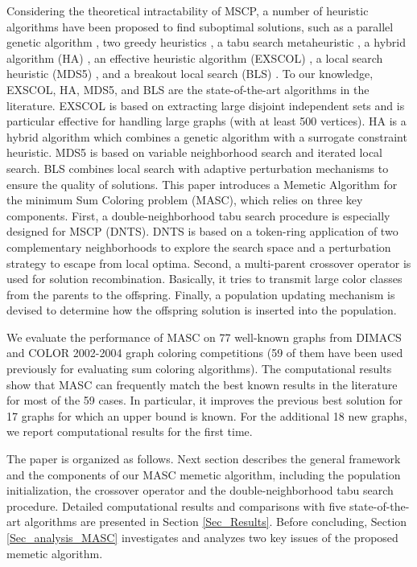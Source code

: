 \documentclass{elsart}
\begin{document}
Considering the theoretical intractability of MSCP, a number of heuristic algorithms have been proposed to find suboptimal solutions, such as a parallel genetic algorithm \cite{Kokosinski&Kwarciany2007}, two greedy heuristics \cite{Li&al2009}, a tabu search metaheuristic \cite{Bouziri&Jouini2010}, a hybrid algorithm (HA) \cite{Douiri&Elbernoussi2011}, an effective heuristic algorithm (EXSCOL) \cite{Wu&Hao2012}, a local search heuristic (MDS5) \cite{Helmar&Chiarandini2011}, and a breakout local search (BLS) \cite{Benlic&Hao2012}. To our knowledge, EXSCOL, HA, MDS5, and BLS are the state-of-the-art algorithms in the literature. EXSCOL is based on extracting large disjoint independent sets and is particular effective for handling large graphs (with at least 500 vertices). HA is a hybrid algorithm which combines a genetic algorithm with a surrogate constraint heuristic. MDS5 is based on variable neighborhood search and iterated local search. BLS combines local search with adaptive perturbation mechanisms to ensure the quality of solutions. 
This paper introduces a Memetic Algorithm for the minimum Sum Coloring problem (MASC), which relies on three key components. First, a double-neighborhood tabu search procedure is especially designed for MSCP (DNTS). DNTS is based on a token-ring application of two complementary neighborhoods to explore the search space and a perturbation strategy to escape from local optima. Second, a multi-parent crossover operator is used for solution recombination. Basically, it tries to transmit large color classes from the parents to the offspring. Finally, a population updating mechanism is devised to determine how the offspring solution is inserted into the population.

We evaluate the performance of MASC on 77 well-known graphs from DIMACS and COLOR 2002-2004 graph coloring competitions (59 of them have been used previously for evaluating sum coloring algorithms). The computational results show that MASC can frequently match the best known results in the literature for most of the 59 cases. In particular, it improves the previous best solution for 17 graphs for which an upper bound is known. For the additional 18 new graphs, we report computational results for the first time.

The paper is organized as follows. Next section describes the general framework and the components of our MASC memetic algorithm, including the population initialization,  the crossover operator and the double-neighborhood tabu search procedure. Detailed computational results and comparisons with five state-of-the-art algorithms are presented in Section \ref{Sec_Results}. Before concluding, Section \ref{Sec_analysis_MASC} investigates and analyzes two key issues of the proposed memetic algorithm.
\end{document}
